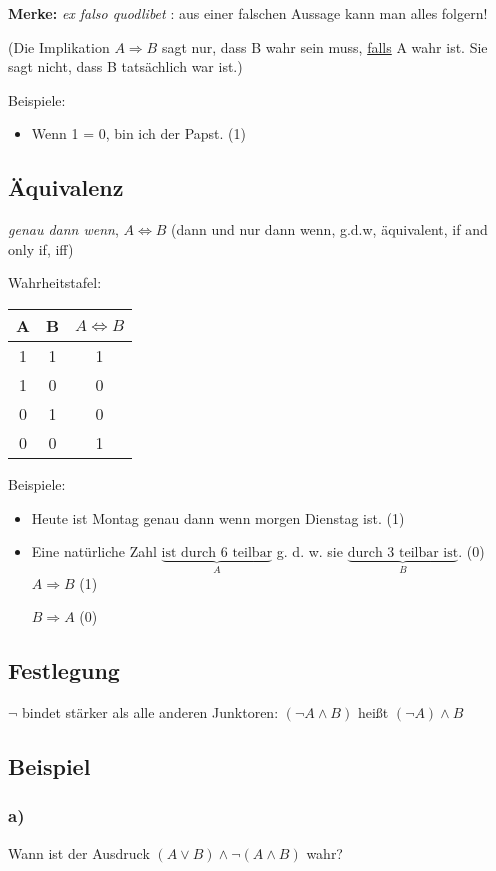 \documentclass[a4paper, 12pt, twoside] {article}
\begin{document}
\textbf{Merke: } \textit{ex falso quodlibet} : aus einer falschen Aussage kann man alles folgern!

(Die Implikation $A \Rightarrow B$ sagt nur, dass B wahr sein muss, \underline{falls} A wahr ist. Sie sagt nicht, dass B tatsächlich war ist.)

Beispiele:
\begin{itemize}
\item Wenn 1 = 0, bin ich der Papst. (1)
\end{itemize}

\subsection{Äquivalenz}
\textit{genau dann wenn}, $ A \Leftrightarrow B$ (dann und nur dann wenn, g.d.w, äquivalent, if and only if, iff)

Wahrheitstafel: \qquad
\begin{tabular}{| c c | c |}
\hline
A & B & $A \Leftrightarrow B$ \\
\hline
1 & 1 & 1 \\
1 & 0 & 0 \\
0 & 1 & 0 \\
0 & 0 & 1 \\
\hline
\end{tabular}

Beispiele:
\begin{itemize}
\item Heute ist Montag genau dann wenn morgen Dienstag ist. (1)
\item Eine natürliche Zahl $\underbrace{\text{ist durch 6 teilbar}}_{A}$ g. d. w. sie $\underbrace{\text{durch 3 teilbar ist}}_{B}$. (0) 
$A \Rightarrow B$ (1) 

$B \Rightarrow A$ (0)
\end{itemize}


\subsection*{Festlegung}
$\neg$ bindet stärker als alle anderen Junktoren: $(\neg A \wedge B)$ heißt $ (\neg A) \wedge B$

\subsection{Beispiel}
\subsubsection*{a)}
Wann ist der Ausdruck $(A \lor B) \wedge \neg (A \wedge B)$ wahr?
\end{document}
